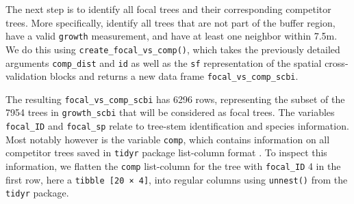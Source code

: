 \documentclass[12pt]{article}
\newenvironment{Shaded}{\begin{snugshade}}{\end{snugshade}}
\newcommand{\CommentTok}[1]{\textcolor[rgb]{0.56,0.35,0.01}{\textit{#1}}}
\newcommand{\DataTypeTok}[1]{\textcolor[rgb]{0.13,0.29,0.53}{#1}}
\newcommand{\KeywordTok}[1]{\textcolor[rgb]{0.13,0.29,0.53}{\textbf{#1}}}
\newcommand{\NormalTok}[1]{#1}
\newcommand{\OperatorTok}[1]{\textcolor[rgb]{0.81,0.36,0.00}{\textbf{#1}}}
\newcommand{\StringTok}[1]{\textcolor[rgb]{0.31,0.60,0.02}{#1}}
\begin{document}
The next step is to identify all focal trees and their corresponding
competitor trees. More specifically, identify all trees that are not
part of the buffer region, have a valid \texttt{growth} measurement, and
have at least one neighbor within 7.5m. We do this using
\texttt{create\_focal\_vs\_comp()}, which takes the previously detailed
arguments \texttt{comp\_dist} and \texttt{id} as well as the \texttt{sf}
representation of the spatial cross-validation blocks and returns a new
data frame \texttt{focal\_vs\_comp\_scbi}.

\begin{Shaded}
\end{Shaded}

The resulting \texttt{focal\_vs\_comp\_scbi} has 6296 rows, representing
the subset of the 7954 trees in \texttt{growth\_scbi} that will be
considered as focal trees. The variables \texttt{focal\_ID} and
\texttt{focal\_sp} relate to tree-stem identification and species
information. Most notably however is the variable \texttt{comp}, which
contains information on all competitor trees saved in \texttt{tidyr}
package list-column format \citep{tidyr_package}. To inspect this
information, we flatten the \texttt{comp} list-column for the tree with
\texttt{focal\_ID} 4 in the first row, here a
\texttt{tibble\ {[}20\ ×\ 4{]}}, into regular columns using
\texttt{unnest()} from the \texttt{tidyr} package.
\end{document}
